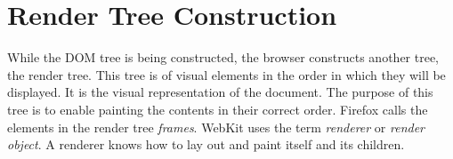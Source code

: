 \documentclass[a4paper, justified, notoc]{tufte-handout} %
\begin{document}
\section{Render Tree Construction} %
\label{sec:render_tree_construction}
While the DOM tree is being constructed, the browser constructs another tree, the render tree. This tree is of visual elements in the order in which they will be displayed. It is the visual representation of the document. The purpose of this tree is to enable painting the contents in their correct order.
Firefox calls the elements in the render tree \emph{frames}. WebKit uses the term \emph{renderer} or \emph{render object}. 
A renderer knows how to lay out and paint itself and its children. 





%
%
\end{document}
